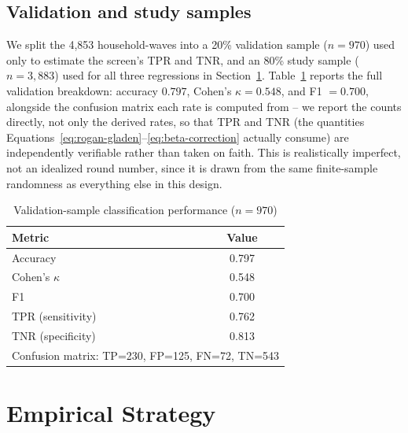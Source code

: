 \documentclass[12pt]{article}
\begin{document}
\subsection{Validation and study samples}

We split the 4,853 household-waves into a 20\% validation sample ($n=970$) used only to estimate the screen's TPR and TNR, and an 80\% study sample ($n=3{,}883$) used for all three regressions in Section~\ref{sec:strategy}. Table~\ref{tab:confusion} reports the full validation breakdown: accuracy $0.797$, Cohen's $\kappa=0.548$, and F1 $=0.700$, alongside the confusion matrix each rate is computed from -- we report the counts directly, not only the derived rates, so that TPR and TNR (the quantities Equations~\ref{eq:rogan-gladen}--\ref{eq:beta-correction} actually consume) are independently verifiable rather than taken on faith. This is realistically imperfect, not an idealized round number, since it is drawn from the same finite-sample randomness as everything else in this design.

\begin{table}[htbp]
\centering
\caption{Validation-sample classification performance ($n=970$)}
\label{tab:confusion}
\begin{tabular}{lc}
\toprule
Metric & Value \\
\midrule
Accuracy & 0.797 \\
Cohen's $\kappa$ & 0.548 \\
F1 & 0.700 \\
TPR (sensitivity) & 0.762 \\
TNR (specificity) & 0.813 \\
\midrule
\multicolumn{2}{l}{Confusion matrix: TP=230, FP=125, FN=72, TN=543} \\
\bottomrule
\end{tabular}
\end{table}

\section{Empirical Strategy}
\label{sec:strategy}
\end{document}
